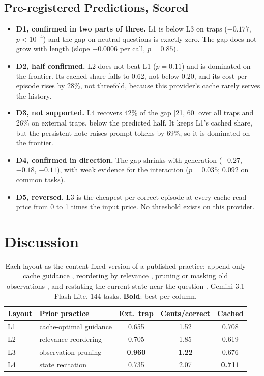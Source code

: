 \subsection{Pre-registered Predictions, Scored}
\begin{itemize}
\item \textbf{D1, confirmed in two parts of three.} L1 is below L3 on traps ($-0.177$, $p < 10^{-4}$) and the gap on neutral questions is exactly zero. The gap does not grow with length (slope $+0.0006$ per call, $p = 0.85$).
\item \textbf{D2, half confirmed.} L2 does not beat L1 ($p = 0.11$) and is dominated on the frontier. Its cached share falls to 0.62, not below 0.20, and its cost per episode rises by 28\%, not threefold, because this provider's cache rarely serves the history.
\item \textbf{D3, not supported.} L4 recovers 42\% of the gap [21, 60] over all traps and 26\% on external traps, below the predicted half. It keeps L1's cached share, but the persistent note raises prompt tokens by 69\%, so it is dominated on the frontier.
\item \textbf{D4, confirmed in direction.} The gap shrinks with generation ($-0.27$, $-0.18$, $-0.11$), with weak evidence for the interaction ($p = 0.035$; $0.092$ on common tasks).
\item \textbf{D5, reversed.} L3 is the cheapest per correct episode at every cache-read price from 0 to 1 times the input price. No threshold exists on this provider.
\end{itemize}

\section{Discussion}
\label{sec:discussion}

\begin{table}[t]
\centering\small
\setlength{\tabcolsep}{2.5pt}
\begin{tabular}{@{}llccc@{}}
\toprule
Layout & Prior practice & Ext.\ trap & Cents/correct & Cached \\
\midrule
L1 & cache-optimal guidance & 0.655 & 1.52 & 0.708 \\
L2 & relevance reordering & 0.705 & 1.85 & 0.619 \\
L3 & observation pruning & \textbf{0.960} & \textbf{1.22} & 0.676 \\
L4 & state recitation & 0.735 & 2.07 & \textbf{0.711} \\
\bottomrule
\end{tabular}
\caption{Each layout as the content-fixed version of a published practice: append-only cache guidance \citep{manus2025,anthropic2025context}, reordering by relevance \citep{a2505_15561}, pruning or masking old observations \citep{a2606_10209,a2508_21433}, and restating the current state near the question \citep{a2410_02810,a2610_01415}. Gemini 3.1 Flash-Lite, 144 tasks. \textbf{Bold}: best per column.}
\label{tab:baselines}
\end{table}

